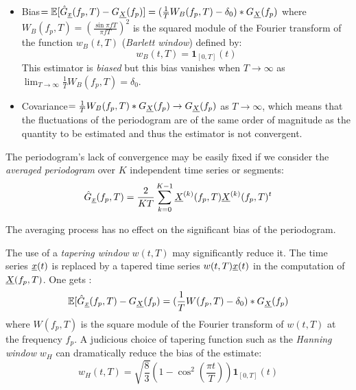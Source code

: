 \begin{itemize}
\item Bias$=\mathbb{E}[\hat{G}_{{\underline{x}}}(f_p, T)-G_{{\underline{X}}}(f_p)]=(\frac{1}{T}W_B(f_p, T)-\delta_0)*G_{{\underline{X}}}(f_p)$ where $W_B(f_p, T) = \left(\frac{\sin\pi fT}{\pi fT}\right)^2$ is the squared module of the Fourier transform of the function $w_B(t, T)$ (\emph{Barlett window}) defined by:
  \begin{equation}
    w_B(t, T) = \mathbf{1}_{[0,T]}(t)
  \end{equation}
  This estimator is \emph{biased} but this bias vanishes when $T\rightarrow\infty$ as $\lim_{T\rightarrow\infty} \frac{1}{T}W_B(f_p, T)=\delta_0$.
\item Covariance$=\frac{1}{T}W_B(f_p, T)*G_{{\underline{X}}}(f_p)\rightarrow G_{{\underline{X}}}(f_p)$ as $T\rightarrow\infty$,
  which means that the fluctuations of the periodogram are of the same order of magnitude as the quantity to be estimated and thus the estimator is not convergent.
\end{itemize}

The periodogram's lack of convergence may be easily fixed if we  consider the \emph{averaged periodogram} over $K$ independent time series or segments:
\begin{equation}
  \hat{G}_{{\underline{x}}}(f_p,T)=\frac{2}{KT}\sum_{k=0}^{K-1}{\underline{X}}^{(k)}(f_p,T){\underline{X}}^{(k)}(f_p,T)^t
\end{equation}

The averaging process has no effect on the significant bias of the periodogram.

The use of a \emph{tapering window} $w(t, T)$ may significantly reduce it. The time series ${\underline{x}}(t)$ is replaced by a tapered time series $w(t, T){\underline{x}}(t)$ in the
computation of ${\underline{X}}(f_p,T)$. One gets :
\begin{equation}
  \mathbb{E}[\hat{G}_{{\underline{x}}}(f_p, T)-G_{{\underline{X}}}(f_p)=(\frac{1}{T}W(f_p, T)-\delta_0)*G_{{\underline{X}}}(f_p)
\end{equation}
where $W(f_p, T)$ is the square module of the Fourier transform of $w(t, T)$ at the frequency $f_p$.
A judicious choice of tapering function such as the \emph{Hanning window} $w_H$ can dramatically reduce the bias of the estimate:
\begin{equation}\label{HamEff}
  w_H(t, T) = \sqrt{\frac{8}{3}}\left(1-\cos^2\left(\frac{\pi t}{T}\right)\right)\mathbf{1}_{[0,T]}(t)
\end{equation}

